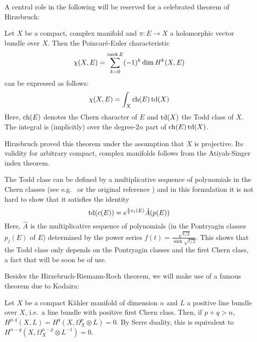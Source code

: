 A central role in the following will be reserved for a celebrated theorem of Hirzebruch:

\begin{thm}
	Let $X$ be a compact, complex manifold and $\pi:E\to X$ a holomorphic vector bundle over $X$. Then the Poincar\'e-Euler characteristic
	\begin{equation*}
		\chi(X,E)=\sum_{k=0}^{\operatorname{rank} E}(-1)^k \dim H^k(X,E)
	\end{equation*}
	can be expressed as follows:
	\begin{equation*}
		\chi(X,E)=\int_X \operatorname{ch}(E)\operatorname{td}(X)
	\end{equation*}
	Here, $\operatorname{ch}(E)$ denotes the Chern character of $E$ and $\operatorname{td}(X)$ the Todd class of $X$. The integral is (implicitly) over the degree-$2n$ part of $\operatorname{ch}(E)\operatorname{td} (X)$.
\end{thm}

\begin{rem}
	Hirzebruch proved this theorem under the assumption that $X$ is projective. Its validity for arbitrary compact, complex manifolds follows from the Atiyah-Singer index theorem.
\end{rem}

The Todd class can be defined by a multiplicative sequence of polynomials in the Chern classes (see e.g.~\cite{MS1974} or the original reference \cite{Hir1966}) and in this formulation it is not hard to show that it satisfies the identity
\begin{equation}\label{eq:todd}
	\operatorname{td}(c(E))=e^{\frac{1}{2}c_1(E)}\hat A(p(E))
\end{equation}
Here, $\hat A$ is the multiplicative sequence of polynomials (in the Pontryagin classes $p_j(E)$ of $E$) determined by the power series $f(t)=\frac{\sqrt{t/2}}{\sinh{\sqrt{t/2}}}$. This shows that the Todd class only depends on the Pontryagin classes and the first Chern class, a fact that will be soon be of use.

Besides the Hirzebruch-Riemann-Roch theorem, we will make use of a famous theorem due to Kodaira:

\begin{thm}
	Let $X$ be a compact K\"ahler manifold of dimension $n$ and $L$ a positive line bundle over $X$, i.e.~a line bundle with positive first Chern class. Then, if $p+q>n$, $H^{p,q}(X,L)=H^q(X,\Omega^p_X\otimes L)=0$. By Serre duality, this is equivalent to $H^{n-q}(X,\Omega^{n-p}_X\otimes L^{-1})=0$.
\end{thm}

